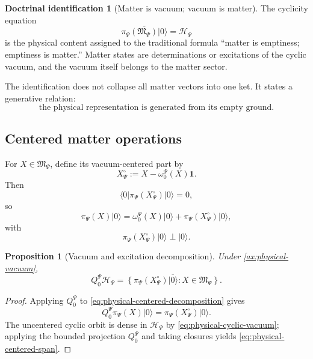 \documentclass[11pt,reqno]{scrartcl}
\newcommand{\scrHP}{\mathscr H_{\Psi}}
\newcommand{\algP}{\mathfrak M_{\Psi}}
\newcommand{\piP}{\pi_{\Psi}}
\newcommand{\omegaP}{\omega_{0}^{\Psi}}
\newcommand{\QzeroP}{Q_{0}^{\Psi}}
\newcommand{\idop}{\mathbf 1}
\newcommand{\ket}[1]{\lvert #1\rangle}
\newcommand{\bra}[1]{\langle #1\rvert}
\theoremstyle{plain}
\newtheorem{proposition}[proposition]{Proposition}
\theoremstyle{definition}
\newtheorem{identification}[identification]{Doctrinal identification}
\theoremstyle{remark}
\begin{document}
\begin{identification}[Matter is vacuum; vacuum is matter]
\label{id:matter-vacuum}
The cyclicity equation
\begin{equation}
  \overline{\piP(\algP)\ket0}=\scrHP
\end{equation}
is the physical content assigned to the traditional formula ``matter is
emptiness; emptiness is matter.''  Matter states are determinations or
excitations of the cyclic vacuum, and the vacuum itself belongs to the matter
sector.
\end{identification}

The identification does not collapse all matter vectors into one ket.  It
states a generative relation:
\begin{equation}
  \boxed{
  \text{the physical representation is generated from its empty ground}.}
  \label{eq:physical-generative-relation}
\end{equation}

\subsection{Centered matter operations}

For $X\in\algP$, define its vacuum-centered part by
\begin{equation}
  X^{\circ}_{\Psi}
  :=X-\omegaP(X)\idop.
  \label{eq:physical-centered-operator}
\end{equation}
Then
\begin{equation}
  \bra0\piP(X^{\circ}_{\Psi})\ket0=0,
\end{equation}
so
\begin{equation}
  \piP(X)\ket0
  =\omegaP(X)\ket0
  +\piP(X^{\circ}_{\Psi})\ket0,
  \label{eq:physical-centered-decomposition}
\end{equation}
with
\begin{equation}
  \piP(X^{\circ}_{\Psi})\ket0\perp\ket0.
\end{equation}

\begin{proposition}[Vacuum and excitation decomposition]
\label{prop:physical-centered-cyclic}
Under \cref{ax:physical-vacuum},
\begin{equation}
  \QzeroP\scrHP
  =\overline{
  \left\{
    \piP(X^{\circ}_{\Psi})\ket0:
    X\in\algP
  \right\}}.
  \label{eq:physical-centered-span}
\end{equation}
\end{proposition}

\begin{proof}
Applying $\QzeroP$ to \eqref{eq:physical-centered-decomposition} gives
\begin{equation}
  \QzeroP\piP(X)\ket0
  =\piP(X^{\circ}_{\Psi})\ket0.
\end{equation}
The uncentered cyclic orbit is dense in $\scrHP$ by
\eqref{eq:physical-cyclic-vacuum}; applying the bounded projection
$\QzeroP$ and taking closures yields \eqref{eq:physical-centered-span}.
\end{proof}
\end{document}
